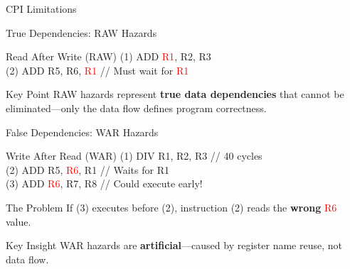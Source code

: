 \documentclass[aspectratio=169,12pt]{beamer}
\begin{document}
\begin{frame}{CPI Limitations}
\end{frame}

\begin{frame}{True Dependencies: RAW Hazards}
    \begin{exampleblock}{Read After Write (RAW)}
        {\ttfamily\footnotesize
        (1) ADD \textcolor{red}{R1}, R2, R3\\
        (2) ADD R5, R6, \textcolor{red}{R1}  // Must wait for \textcolor{red}{R1}
        }
    \end{exampleblock}
    
    \begin{alertblock}{Key Point}
        RAW hazards represent \textbf{true data dependencies} that cannot be eliminated—only the data flow defines program correctness.
    \end{alertblock}
\end{frame}

\begin{frame}{False Dependencies: WAR Hazards}
    \begin{exampleblock}{Write After Read (WAR)}
        {\ttfamily\footnotesize
        (1) DIV R1, R2, R3  // 40 cycles\\
        (2) ADD R5, \textcolor{red}{R6}, R1  // Waits for R1\\
        (3) ADD \textcolor{red}{R6}, R7, R8  // Could execute early!
        }
    \end{exampleblock}
    
    \begin{block}{The Problem}
        If (3) executes before (2), instruction (2) reads the \textbf{wrong} \textcolor{red}{R6} value.
    \end{block}
    
    \begin{alertblock}{Key Insight}
        WAR hazards are \textbf{artificial}—caused by register name reuse, not data flow.
    \end{alertblock}
\end{frame}
\end{document}
